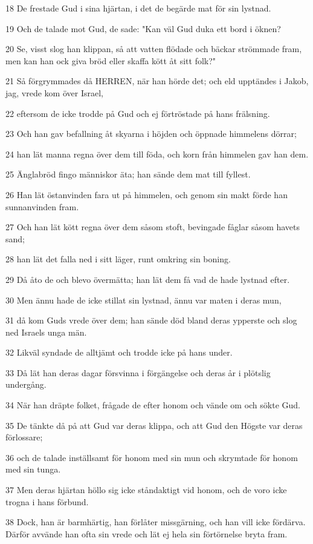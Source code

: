 \par 18 De frestade Gud i sina hjärtan, i det de begärde mat för sin lystnad.
\par 19 Och de talade mot Gud, de sade: "Kan väl Gud duka ett bord i öknen?
\par 20 Se, visst slog han klippan, så att vatten flödade och bäckar strömmade fram, men kan han ock giva bröd eller skaffa kött åt sitt folk?"
\par 21 Så förgrymmades då HERREN, när han hörde det; och eld upptändes i Jakob, jag, vrede kom över Israel,
\par 22 eftersom de icke trodde på Gud och ej förtröstade på hans frälsning.
\par 23 Och han gav befallning åt skyarna i höjden och öppnade himmelens dörrar;
\par 24 han lät manna regna över dem till föda, och korn från himmelen gav han dem.
\par 25 Änglabröd fingo människor äta; han sände dem mat till fyllest.
\par 26 Han lät östanvinden fara ut på himmelen, och genom sin makt förde han sunnanvinden fram.
\par 27 Och han lät kött regna över dem såsom stoft, bevingade fåglar såsom havets sand;
\par 28 han lät det falla ned i sitt läger, runt omkring sin boning.
\par 29 Då åto de och blevo övermätta; han lät dem få vad de hade lystnad efter.
\par 30 Men ännu hade de icke stillat sin lystnad, ännu var maten i deras mun,
\par 31 då kom Guds vrede över dem; han sände död bland deras ypperste och slog ned Israels unga män.
\par 32 Likväl syndade de alltjämt och trodde icke på hans under.
\par 33 Då lät han deras dagar försvinna i förgängelse och deras år i plötslig undergång.
\par 34 När han dräpte folket, frågade de efter honom och vände om och sökte Gud.
\par 35 De tänkte då på att Gud var deras klippa, och att Gud den Högste var deras förlossare;
\par 36 och de talade inställsamt för honom med sin mun och skrymtade för honom med sin tunga.
\par 37 Men deras hjärtan höllo sig icke ståndaktigt vid honom, och de voro icke trogna i hans förbund.
\par 38 Dock, han är barmhärtig, han förlåter missgärning, och han vill icke fördärva. Därför avvände han ofta sin vrede och lät ej hela sin förtörnelse bryta fram.

